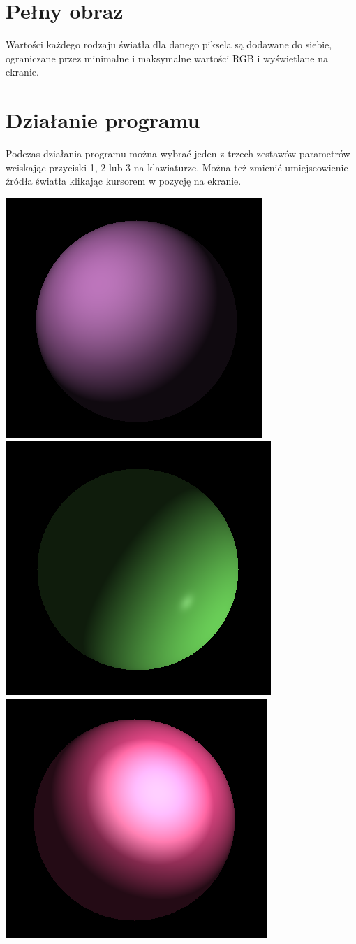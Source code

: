 \documentclass[a4paper,11pt]{article}
\begin{document}
\section{Pełny obraz}
Wartości każdego rodzaju światła dla danego piksela są dodawane do 
siebie, ograniczane przez minimalne i maksymalne wartości RGB i 
wyświetlane na ekranie.


\section{Działanie programu}
Podczas działania programu można wybrać jeden z trzech zestawów 
parametrów wciskając przyciski 1, 2 lub 3 na klawiaturze. Można 
też zmienić umiejscowienie źródła światła klikając kursorem w pozycję 
na ekranie.

\begin{center}
    \includegraphics[height=0.27\columnwidth]{full1.png}
    \includegraphics[height=0.27\columnwidth]{alt2.png}
    \includegraphics[height=0.27\columnwidth]{alt3.png}
\end{center}
\end{document}
